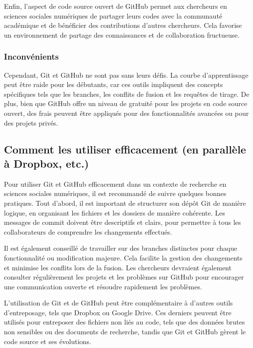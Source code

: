 \documentclass[
  letterpaper,
]{scrbook}
\begin{document}
Enfin, l'aspect de code source ouvert de GitHub permet aux chercheurs en
sciences sociales numériques de partager leurs codes avec la communauté
académique et de bénéficier des contributions d'autres chercheurs. Cela
favorise un environnement de partage des connaissances et de
collaboration fructueuse.

\hypertarget{inconvuxe9nients}{%
\subsubsection{Inconvénients}\label{inconvuxe9nients}}

Cependant, Git et GitHub ne sont pas sans leurs défis. La courbe
d'apprentissage peut être raide pour les débutants, car ces outils
impliquent des concepts spécifiques tels que les branches, les conflits
de fusion et les requêtes de tirage. De plus, bien que GitHub offre un
niveau de gratuité pour les projets en code source ouvert, des frais
peuvent être appliqués pour des fonctionnalités avancées ou pour des
projets privés.

\hypertarget{comment-les-utiliser-efficacement-en-paralluxe8le-uxe0-dropbox-etc.}{%
\subsection{Comment les utiliser efficacement (en parallèle à Dropbox,
etc.)}\label{comment-les-utiliser-efficacement-en-paralluxe8le-uxe0-dropbox-etc.}}

Pour utiliser Git et GitHub efficacement dans un contexte de recherche
en sciences sociales numériques, il est recommandé de suivre quelques
bonnes pratiques. Tout d'abord, il est important de structurer son dépôt
Git de manière logique, en organisant les fichiers et les dossiers de
manière cohérente. Les messages de commit doivent être descriptifs et
clairs, pour permettre à tous les collaborateurs de comprendre les
changements effectués.

Il est également conseillé de travailler sur des branches distinctes
pour chaque fonctionnalité ou modification majeure. Cela facilite la
gestion des changements et minimise les conflits lors de la fusion. Les
chercheurs devraient également consulter régulièrement les projets et
les problèmes sur GitHub pour encourager une communication ouverte et
résoudre rapidement les problèmes.

L'utilisation de Git et de GitHub peut être complémentaire à d'autres
outils d'entreposage, tels que Dropbox ou Google Drive. Ces derniers
peuvent être utilisés pour entreposer des fichiers non liés au code,
tels que des données brutes non sensibles ou des documents de recherche,
tandis que Git et GitHub gèrent le code source et ses évolutions.
\end{document}
